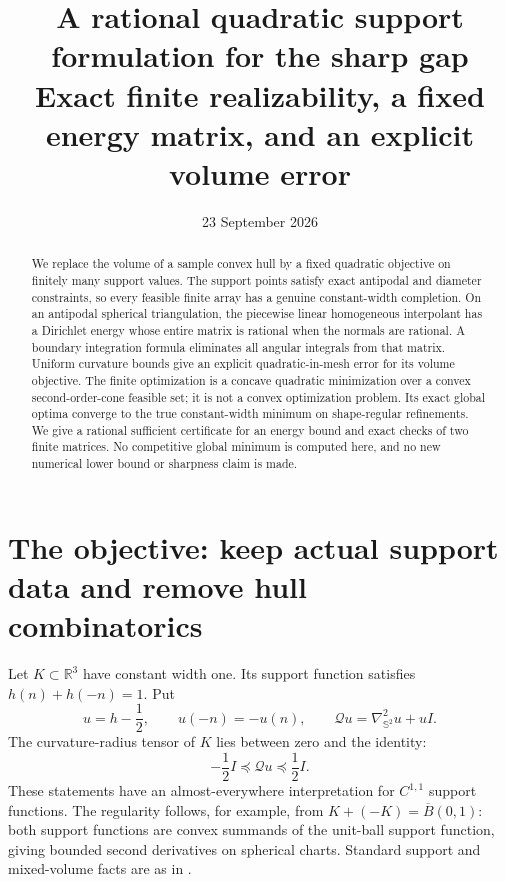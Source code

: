 \documentclass[11pt]{article}
\title{\Large\bfseries A rational quadratic support formulation for the sharp gap\\[5pt]
\normalsize Exact finite realizability, a fixed energy matrix, and an explicit volume error}
\author{}\date{23 September 2026}
\theoremstyle{remark}\newtheorem{remark}[theorem]{Remark}
\newcommand{\R}{\mathbb R}
\newcommand{\Sph}{\mathbb S^2}
\newcommand{\Q}{\mathcal Q}
\numberwithin{equation}{section}
\begin{document}
\maketitle
\begin{abstract}
We replace the volume of a sample convex hull by a fixed quadratic objective
on finitely many support values. The support points satisfy exact antipodal
and diameter constraints, so every feasible finite array has a genuine
constant-width completion. On an antipodal spherical triangulation, the
piecewise linear homogeneous interpolant has a Dirichlet energy whose entire
matrix is rational when the normals are rational. A boundary integration
formula eliminates all angular integrals from that matrix. Uniform curvature
bounds give an explicit quadratic-in-mesh error for its volume objective.
The finite optimization is a concave quadratic minimization over a convex
second-order-cone feasible set; it is not a convex optimization problem.
Its exact global optima converge to the true constant-width minimum on
shape-regular refinements. We give a rational sufficient certificate for an
energy bound and exact checks of two finite matrices. No competitive global
minimum is computed here, and no new numerical lower bound or sharpness
claim is made.
\end{abstract}

\section{The objective: keep actual support data and remove hull combinatorics}
Let $K\subset\R^3$ have constant width one. Its support function satisfies
$h(n)+h(-n)=1$. Put
\[
 u=h-\frac12,\qquad u(-n)=-u(n),\qquad
 \Q u=\nabla^2_{\Sph}u+uI.
\]
The curvature-radius tensor of $K$ lies between zero and the identity:
\begin{equation}\label{eq:curvature}
 -\frac12 I\preceq\Q u\preceq\frac12 I.
\end{equation}
These statements have an almost-everywhere interpretation for $C^{1,1}$
support functions. The regularity follows, for example, from
$K+(-K)=\overline B(0,1)$: both support functions are convex summands of the
unit-ball support function, giving bounded second derivatives on spherical
charts. Standard support and mixed-volume facts are as in \cite{Schneider}.
\end{document}
